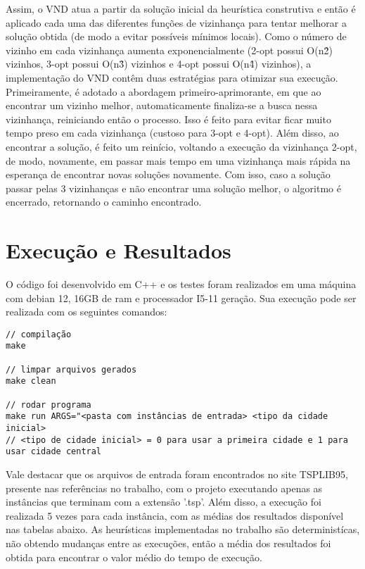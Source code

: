 \documentclass[10pt]{extarticle} %
\begin{document}
Assim, o VND atua a partir da solução inicial da heurística construtiva e então é aplicado cada uma das diferentes funções de vizinhança para tentar melhorar a solução obtida (de modo a evitar possíveis mínimos locais). Como o número de vizinho em cada vizinhança aumenta exponencialmente (2-opt possui O(n\^2) vizinhos, 3-opt possui O(n\^3) vizinhos e 4-opt possui O(n\^4) vizinhos), a implementação do VND contêm duas estratégias para otimizar sua execução. Primeiramente, é adotado a abordagem primeiro-aprimorante, em que ao encontrar um vizinho melhor, automaticamente finaliza-se a busca nessa vizinhança, reiniciando então o processo. Isso é feito para evitar ficar muito tempo preso em cada vizinhança (custoso para 3-opt e 4-opt). Além disso, ao encontrar a solução, é feito um reinício, voltando a execução da vizinhança 2-opt, de modo, novamente, em passar mais tempo em uma vizinhança mais rápida na esperança de encontrar novas soluções novamente. Com isso, caso a solução passar pelas 3 vizinhanças e não encontrar uma solução melhor, o algoritmo é encerrado, retornando o caminho encontrado.

\section{Execução e Resultados}

O código foi desenvolvido em C++ e os testes foram realizados em uma máquina com debian 12, 16GB de ram e processador I5-11 geração. Sua execução pode ser realizada com os seguintes comandos:

\begin{verbatim}
// compilação
make

// limpar arquivos gerados
make clean

// rodar programa
make run ARGS="<pasta com instâncias de entrada> <tipo da cidade inicial>
// <tipo de cidade inicial> = 0 para usar a primeira cidade e 1 para usar cidade central
\end{verbatim}

Vale destacar que os arquivos de entrada foram encontrados no site TSPLIB95, presente nas referências no trabalho, com o projeto executando apenas as instâncias que terminam com a extensão '.tsp'. Além disso, a execução foi realizada 5 vezes para cada instância, com as médias dos resultados disponível nas tabelas abaixo. As heurísticas implementadas no trabalho são deterministícas, não obtendo mudanças entre as execuções, então a média dos resultados foi obtida para encontrar o valor médio do tempo de execução.
\end{document}
